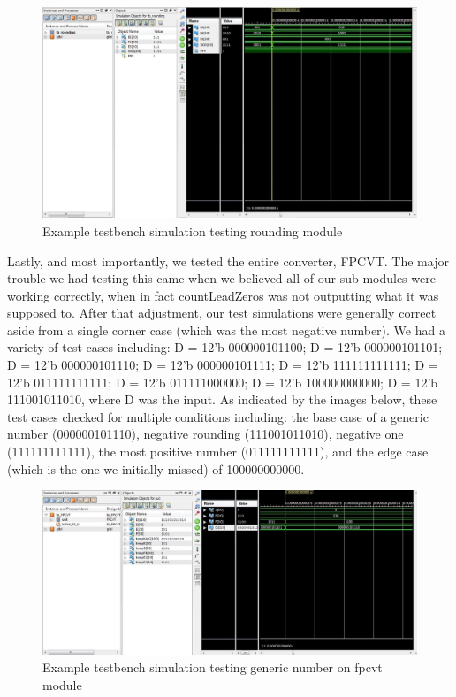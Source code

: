 \documentclass{article}
\begin{document}
\begin{figure}[H]
	\begin{center}
		\includegraphics[width=1.2\textwidth]{sim5.png} 
		\caption{Example testbench simulation testing rounding module}
	\end{center}
\end{figure}

Lastly, and most importantly, we tested the entire converter, FPCVT.  The major trouble we had testing this came when we believed all of our sub-modules were working correctly, when in fact countLeadZeros was not outputting what it was supposed to.  After that adjustment, our test simulations were generally correct aside from a single corner case (which was the most negative number).  We had a variety of test cases including: D = 12'b 000000101100; D = 12'b 000000101101; D = 12'b 000000101110; D = 12'b 000000101111; D = 12'b 111111111111; D = 12'b 011111111111; D = 12'b 011111000000; D = 12'b 100000000000; D = 12'b 111001011010, where D was the input.  As indicated by the images below, these test cases checked for multiple conditions including: the base case of a generic number (000000101110), negative rounding (111001011010), negative one (111111111111), the most positive number (011111111111), and the edge case (which is the one we initially missed) of 100000000000. 

\begin{figure}[H]
	\begin{center}
		\includegraphics[width=1.2\textwidth]{sim3.png} 
		\caption{Example testbench simulation testing generic number on fpcvt module}
	\end{center}
\end{figure}
\end{document}
